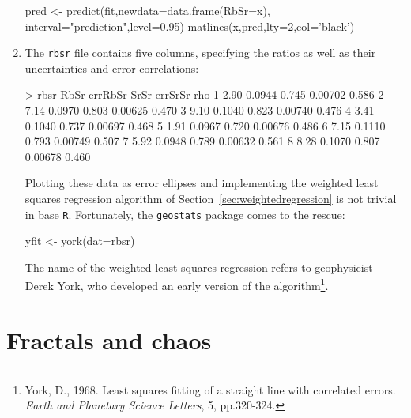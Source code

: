 \begin{enumerate}
\begin{script}[firstnumber=8]
pred <- predict(fit,newdata=data.frame(RbSr=x),
                interval="prediction",level=0.95)
matlines(x,pred,lty=2,col='black')
\end{script}

\item The \texttt{rbsr} file contains five columns, specifying the
  ratios as well as their uncertainties and error correlations:

\begin{console}
> rbsr
  RbSr errRbSr  SrSr errSrSr   rho
1 2.90  0.0944 0.745 0.00702 0.586
2 7.14  0.0970 0.803 0.00625 0.470
3 9.10  0.1040 0.823 0.00740 0.476
4 3.41  0.1040 0.737 0.00697 0.468
5 1.91  0.0967 0.720 0.00676 0.486
6 7.15  0.1110 0.793 0.00749 0.507
7 5.92  0.0948 0.789 0.00632 0.561
8 8.28  0.1070 0.807 0.00678 0.460
\end{console}

Plotting these data as error ellipses and implementing the
weighted least squares regression algorithm of
Section~\ref{sec:weightedregression} is not trivial in base
\texttt{R}. Fortunately, the \texttt{geostats} package comes to the
rescue:

\begin{script}
yfit <- york(dat=rbsr)
\end{script}

The name of the weighted least squares regression refers to
geophysicist Derek York, who developed an early version of the
algorithm\footnote{York, D., 1968. Least squares fitting of a straight
  line with correlated errors. \emph{Earth and Planetary Science
    Letters}, 5, pp.320-324.}.

\end{enumerate}

\section{Fractals and chaos}
\label{sec:R-fractals}

